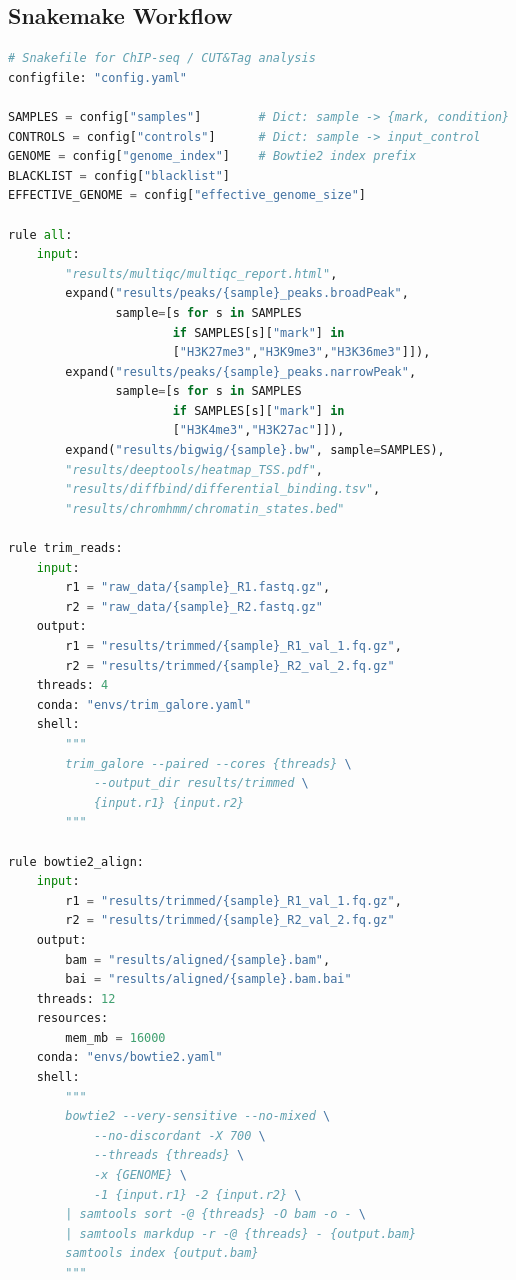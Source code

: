 \subsection{Snakemake Workflow}
\label{subsec:histones:snakemake}

\begin{lstlisting}[language=Python, caption={Snakemake workflow for ChIP-seq/CUT\&Tag analysis.}, label={lst:histones:snakemake}]
# Snakefile for ChIP-seq / CUT&Tag analysis
configfile: "config.yaml"

SAMPLES = config["samples"]        # Dict: sample -> {mark, condition}
CONTROLS = config["controls"]      # Dict: sample -> input_control
GENOME = config["genome_index"]    # Bowtie2 index prefix
BLACKLIST = config["blacklist"]
EFFECTIVE_GENOME = config["effective_genome_size"]

rule all:
    input:
        "results/multiqc/multiqc_report.html",
        expand("results/peaks/{sample}_peaks.broadPeak",
               sample=[s for s in SAMPLES
                       if SAMPLES[s]["mark"] in
                       ["H3K27me3","H3K9me3","H3K36me3"]]),
        expand("results/peaks/{sample}_peaks.narrowPeak",
               sample=[s for s in SAMPLES
                       if SAMPLES[s]["mark"] in
                       ["H3K4me3","H3K27ac"]]),
        expand("results/bigwig/{sample}.bw", sample=SAMPLES),
        "results/deeptools/heatmap_TSS.pdf",
        "results/diffbind/differential_binding.tsv",
        "results/chromhmm/chromatin_states.bed"

rule trim_reads:
    input:
        r1 = "raw_data/{sample}_R1.fastq.gz",
        r2 = "raw_data/{sample}_R2.fastq.gz"
    output:
        r1 = "results/trimmed/{sample}_R1_val_1.fq.gz",
        r2 = "results/trimmed/{sample}_R2_val_2.fq.gz"
    threads: 4
    conda: "envs/trim_galore.yaml"
    shell:
        """
        trim_galore --paired --cores {threads} \
            --output_dir results/trimmed \
            {input.r1} {input.r2}
        """

rule bowtie2_align:
    input:
        r1 = "results/trimmed/{sample}_R1_val_1.fq.gz",
        r2 = "results/trimmed/{sample}_R2_val_2.fq.gz"
    output:
        bam = "results/aligned/{sample}.bam",
        bai = "results/aligned/{sample}.bam.bai"
    threads: 12
    resources:
        mem_mb = 16000
    conda: "envs/bowtie2.yaml"
    shell:
        """
        bowtie2 --very-sensitive --no-mixed \
            --no-discordant -X 700 \
            --threads {threads} \
            -x {GENOME} \
            -1 {input.r1} -2 {input.r2} \
        | samtools sort -@ {threads} -O bam -o - \
        | samtools markdup -r -@ {threads} - {output.bam}
        samtools index {output.bam}
        """


\end{lstlisting}
